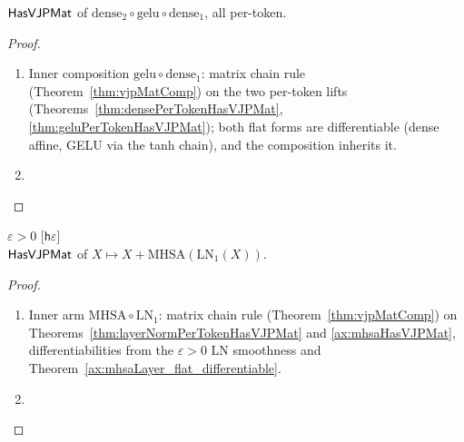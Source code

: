 \begin{theorem}
  \label{thm:transformerMlpHasVJPMat}
  \leanok
  \(\mathsf{HasVJPMat}\) of
  \(\mathrm{dense}_2 \circ \mathrm{gelu} \circ \mathrm{dense}_1\),
  all per-token.
\end{theorem}

\begin{proof}
\leanok
\begin{enumerate}
  \item Inner composition \(\mathrm{gelu} \circ \mathrm{dense}_1\):
    matrix chain rule (Theorem~\ref{thm:vjpMatComp}) on the two
    per-token lifts (Theorems~\ref{thm:densePerTokenHasVJPMat},
    \ref{thm:geluPerTokenHasVJPMat}); both flat forms are
    differentiable (dense affine, GELU via the tanh chain), and the
    composition inherits it.
  \item \Qed{}
\end{enumerate}
\end{proof}

\begin{theorem}
  \label{thm:transformerAttnSublayerHasVJPMat}
  \leanok
  \Assume{} \(\varepsilon > 0\) \hfill[\texttt{h\(\varepsilon\)}]\\
  \Prove{} \(\mathsf{HasVJPMat}\) of
  \(X \mapsto X + \mathrm{MHSA}(\mathrm{LN}_1(X))\).
\end{theorem}

\begin{proof}
\leanok
\begin{enumerate}
  \item Inner arm \(\mathrm{MHSA} \circ \mathrm{LN}_1\): matrix chain
    rule (Theorem~\ref{thm:vjpMatComp}) on
    Theorems~\ref{thm:layerNormPerTokenHasVJPMat} and
    \ref{ax:mhsaHasVJPMat}, differentiabilities from the
    \(\varepsilon > 0\) LN smoothness and
    Theorem~\ref{ax:mhsaLayer_flat_differentiable}.
  \item \Qed{}
\end{enumerate}
\end{proof}

